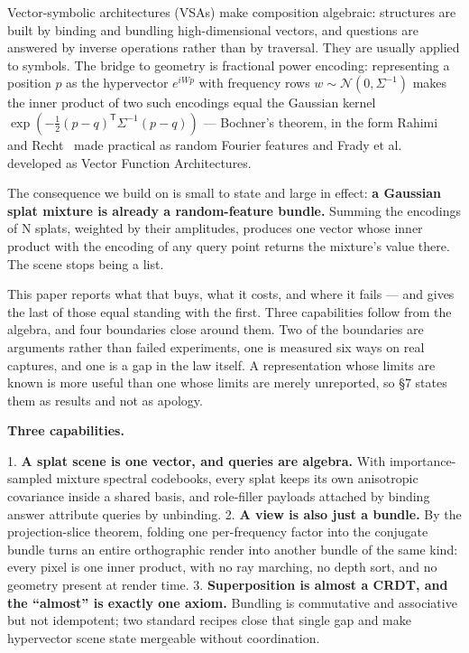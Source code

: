 \documentclass[11pt]{article}
\begin{document}
Vector-symbolic architectures (VSAs) make composition algebraic:
structures are built by binding and bundling high-dimensional vectors,
and questions are answered by inverse operations rather than by
traversal. They are usually applied to symbols. The bridge to geometry
is fractional power encoding: representing a position $p$ as the
hypervector $e^{iWp}$ with frequency rows $w \sim \mathcal{N}(0,
\Sigma^{-1})$ makes the inner product of two such encodings equal the
Gaussian kernel
$\exp\!\left(-\tfrac{1}{2}(p-q)^{\mathsf{T}}\Sigma^{-1}(p-q)\right)$ ---
Bochner's theorem, in the form Rahimi and Recht~\cite{rahimi2007random}
made practical as random Fourier features and Frady et
al.~\cite{frady2021vfa} developed as Vector Function Architectures.

The consequence we build on is small to state and large in effect:
\textbf{a Gaussian splat mixture is already a random-feature bundle.}
Summing the encodings of N splats, weighted by their amplitudes,
produces one vector whose inner product with the encoding of any query
point returns the mixture's value there. The scene stops being a list.

This paper reports what that buys, what it costs, and where it fails ---
and gives the last of those equal standing with the first. Three
capabilities follow from the algebra, and four boundaries close around
them. Two of the boundaries are arguments rather than failed
experiments, one is measured six ways on real captures, and one is a gap
in the law itself. A representation whose limits are known is more
useful than one whose limits are merely unreported, so \S7 states them
as results and not as apology.

\textbf{Three capabilities.}

1. \textbf{A splat scene is one vector, and queries are algebra.} With
importance-sampled mixture spectral codebooks, every splat keeps its own
anisotropic covariance inside a shared basis, and role-filler payloads
attached by binding answer attribute queries by unbinding. 2. \textbf{A
view is also just a bundle.} By the projection-slice theorem, folding
one per-frequency factor into the conjugate bundle turns an entire
orthographic render into another bundle of the same kind: every pixel is
one inner product, with no ray marching, no depth sort, and no geometry
present at render time. 3. \textbf{Superposition is almost a CRDT, and
the ``almost'' is exactly one axiom.} Bundling is commutative and
associative but not idempotent; two standard recipes close that single
gap and make hypervector scene state mergeable without coordination.
\end{document}
